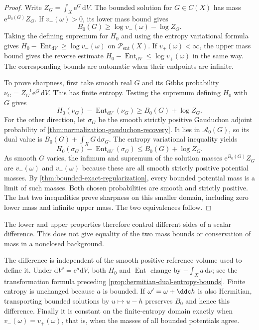 \begin{proof}
Write $Z_G=\int_X\mathrm{e}^G\,\mathrm{d}V$. The bounded solution for $G\in C(X)$ has mass $\mathrm{e}^{B_0(G)}Z_G$. If $v_-(\omega)>0$, its lower mass bound gives
\[
 B_0(G)\geq\log v_-(\omega)-\log Z_G.
\]
Taking the defining supremum for $H_0$ and using the entropy variational formula gives $H_0-\operatorname{Ent}_{\mathrm{d}V}\geq\log v_-(\omega)$ on $\mathcal P_{\mathrm{ent}}(X)$. If $v_+(\omega)<\infty$, the upper mass bound gives the reverse estimate $H_0-\operatorname{Ent}_{\mathrm{d}V}\leq\log v_+(\omega)$ in the same way. The corresponding bounds are automatic when their endpoints are infinite.

To prove sharpness, first take smooth real $G$ and its Gibbs probability $\nu_G=Z_G^{-1}\mathrm{e}^G\,\mathrm{d}V$. This has finite entropy. Testing the supremum defining $H_0$ with $G$ gives
\[
 H_0(\nu_G)-\operatorname{Ent}_{\mathrm{d}V}(\nu_G)
       \geq B_0(G)+\log Z_G.
\]
For the other direction, let $\sigma_G$ be the smooth strictly positive Gauduchon adjoint probability of \cref{thm:normalization-gauduchon-recovery}. It lies in $\mathcal A_0(G)$, so its dual value is $B_0(G)+\int_XG\,\mathrm{d}\sigma_G$. The entropy variational inequality yields
\[
 H_0(\sigma_G)-\operatorname{Ent}_{\mathrm{d}V}(\sigma_G)
       \leq B_0(G)+\log Z_G.
\]
As smooth $G$ varies, the infimum and supremum of the solution masses $\mathrm{e}^{B_0(G)}Z_G$ are $v_-(\omega)$ and $v_+(\omega)$ because these are all smooth strictly positive potential masses. By \cref{thm:bounded-exact-regularization}, every bounded potential mass is a limit of such masses. Both chosen probabilities are smooth and strictly positive. The last two inequalities prove sharpness on this smaller domain, including zero lower mass and infinite upper mass. The two equivalences follow.
\end{proof}

The lower and upper properties therefore control different sides of a scalar difference. This does not give equality of the two mass bounds or conservation of mass in a nonclosed background.

The difference is independent of the smooth positive reference volume used to define it. Under $\mathrm{d}V'=\mathrm{e}^a\mathrm{d}V$, both $H_0$ and $\operatorname{Ent}$ change by $-\int_Xa\,\mathrm{d}\nu$; see the transformation formula preceding \cref{prop:hermitian-dual-entropy-bounds}. Finite entropy is unchanged because $a$ is bounded. If $\omega'=\omega+\ddc h$ is also Hermitian, transporting bounded solutions by $u\mapsto u-h$ preserves $B_0$ and hence this difference. Finally it is constant on the finite-entropy domain exactly when $v_-(\omega)=v_+(\omega)$, that is, when the masses of all bounded potentials agree.
